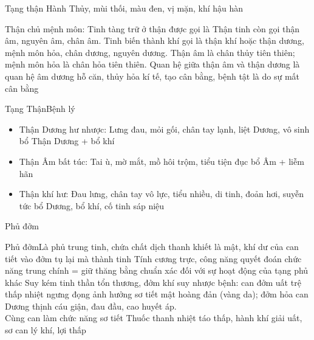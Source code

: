 \documentclass[
	11pt, %
]{beamer}
\theoremstyle{newblock}
\begin{document}
\begin{frame}{Tạng thận}{ Hành Thủy, mùi thối, màu đen, vị mặn, khí hậu hàn}
\begin{itemize}
{	\item Thận chủ mệnh môn: Tinh tàng trữ ở thận được gọi là Thận tinh còn gọi thận âm, nguyên âm, chân âm. Tinh biến thành khí gọi là thận khí hoặc thận dương, mệnh môn hỏa, chân dương, nguyên dương. Thận âm là chân thủy tiên thiên; mệnh môn hỏa là chân hỏa tiên thiên. Quan hệ giữa thận âm và thận dương là quan hệ âm dương hỗ căn, thủy hỏa kí tế, tạo cân bằng, bệnh tật là do sự mất cân bằng
	}
\end{itemize}
\end{frame}
\begin{frame}{Tạng Thận}{Bệnh lý}
\begin{itemize}
	\item Thận Dương hư nhược: Lưng đau, mỏi gối, chân tay lạnh, liệt Dương, vô sinh bổ Thận Dương + bổ khí
	\item Thận Âm bất túc: Tai ù, mờ mắt, mồ hôi trộm, tiểu tiện đục bổ Âm + liễm hãn
	\item Thận khí hư: Đau lưng, chân tay vô lực, tiểu nhiều, di tinh, đoản hơi, suyễn tức bổ Dương, bổ khí, cố tinh sáp niệu
\end{itemize}
\end{frame}
\begin{frame}
	\Huge{Phủ đởm}
\end{frame}
\begin{frame}{Phủ đởm}{Là phủ trung tinh, chứa chất dịch thanh khiết 	là mật, khí dư của can tiết vào đởm tụ lại mà 	thành tinh}
Tính cương trực, công năng quyết đoán  	chức  năng  trung  chính  =  giữ  thăng  bằng 	chuẩn xác đối với sự hoạt động của tạng phủ 	khác  Suy  kém    tinh  thần  tổn  thương, 	đởm khí suy nhược  bệnh: can đởm uất trệ thấp nhiệt ngưng đọng  ảnh hưởng sơ tiết mật  hoàng đản (vàng da); đởm hỏa  can Dương thịnh  cáu giận, đau đầu, cao huyết áp.\\
Cùng can làm chức năng sơ tiết  Thuốc 	thanh nhiệt táo thấp, hành khí giải uất, sơ can 	lý khí, lợi thấp
\end{frame}
\end{document}
